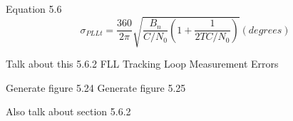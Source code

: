 
Equation 5.6
\begin{equation}
\sigma_{PLLt} = \frac{360}{2 \pi} \sqrt{\frac{B_n}{C/N_0}(1+\frac{1}{2TC/N_0})} (degrees)
\end{equation}





Talk about this
5.6.2 FLL Tracking Loop Measurement Errors

Generate figure 5.24
Generate figure 5.25

Also talk about section 5.6.2








\begin{comment}

\chapter{Preliminary Work}\label{ch:PreliminaryWork}
Significant preliminary work has been carried out, because of the challenging scope of thesis. 

In order to have a rigorous understanding of the dynamic performance of the Namuru receiver, we must first examine the theoretical basis for the operation of its tracking loops. 

A model of the operation of the tracking loops can be established by building upon intellectual foundations laid in continuous time control theory. While this Laplace domain model provides an idealised understanding of the \ac{PLL}, it does not take into the effects of delay and jitter in the loop. 

\ac{PLL}, \ac{FLL} and \ac{DLL} are all examples of control systems. By convention, what is referred to in the parlance of control theory as a "controller" is referred to as the "loop filter" in \ac{GNSS} related literature. One key point to keep in mind with a \ac{PLL} is that a phase input results in a frequency output. This effective integration occurs in the \ac{VCO}.

\section{Current Namuru architecture}
A significant amount of time has been spent gaining an understanding of the Namuru receiver, its architecture and the operation of it's sub-systems. The receiver is a mixed signal device, which has been the focus of a decade of research and development. 


\end{comment}
